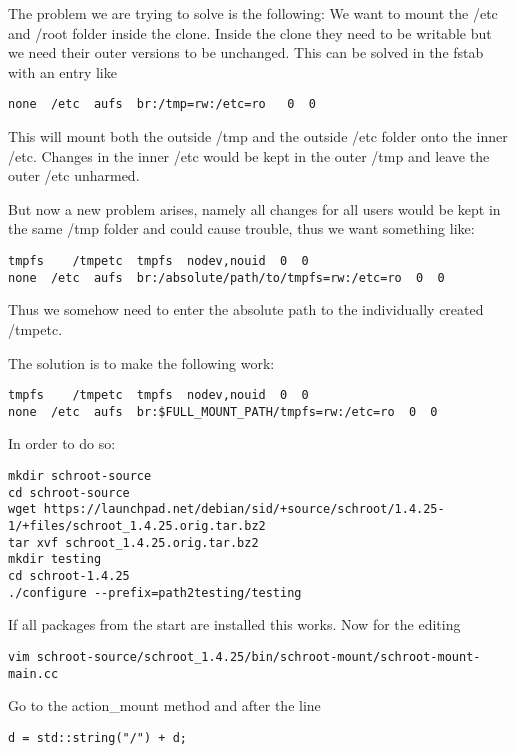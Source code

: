 \documentclass[a4paper]{book}
\begin{document}
The problem we are trying to solve is the following: We want to mount the /etc
and /root folder inside the clone. Inside the clone they need to be writable
but we need their outer versions to be unchanged.  This can be solved in the
fstab with an entry like

\begin{verbatim}
none  /etc  aufs  br:/tmp=rw:/etc=ro   0  0
\end{verbatim}

This will mount both the outside /tmp and the outside /etc folder onto the
inner /etc. Changes in the inner /etc would be kept in the outer /tmp and leave
the outer /etc unharmed.

But now a new problem arises, namely all changes for all users would be kept in
the same /tmp folder and could cause trouble, thus we want something like:

\begin{verbatim}
tmpfs    /tmpetc  tmpfs  nodev,nouid  0  0
none  /etc  aufs  br:/absolute/path/to/tmpfs=rw:/etc=ro  0  0
\end{verbatim}

Thus we somehow need to enter the absolute path to the individually created /tmpetc.

The solution is to make the following work:

\begin{verbatim}
tmpfs    /tmpetc  tmpfs  nodev,nouid  0  0
none  /etc  aufs  br:$FULL_MOUNT_PATH/tmpfs=rw:/etc=ro  0  0
\end{verbatim}

In order to do so:

\begin{verbatim}
mkdir schroot-source
cd schroot-source
wget https://launchpad.net/debian/sid/+source/schroot/1.4.25-1/+files/schroot_1.4.25.orig.tar.bz2
tar xvf schroot_1.4.25.orig.tar.bz2
mkdir testing
cd schroot-1.4.25
./configure --prefix=path2testing/testing
\end{verbatim}

If all packages from the start are installed this works.
Now for the editing

\begin{verbatim}
vim schroot-source/schroot_1.4.25/bin/schroot-mount/schroot-mount-main.cc
\end{verbatim}

Go to the action\_mount method and after the line

\begin{verbatim}
d = std::string("/") + d;
\end{verbatim}
\end{document}
